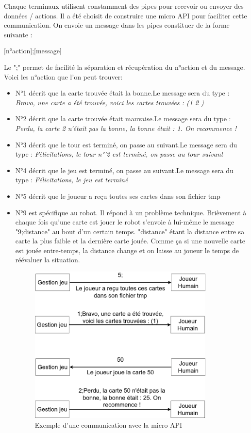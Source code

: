 \documentclass{article}
\begin{document}
Chaque terminaux utilisent constamment des pipes pour recevoir ou envoyer des données / actions. Il a été choisit de construire une micro API pour faciliter cette communication. On envoie un message dans les pipes constituer de la forme suivante :
\begin{center}
[n°action];[message]
\end{center}
Le ";" permet de facilité la séparation et récupération du n°action et du message. Voici les n°action que l'on peut trouver:
\begin{itemize}
	\item N°1 décrit que la carte trouvée était la bonne.\newline Le message sera du type : \textit{Bravo, une carte a été trouvée, voici les cartes trouvées : (1 2 )}
	\item N°2 décrit que la carte trouvée était mauvaise.\newline Le message sera du type : \textit{Perdu, la carte 2 n'était pas la bonne, la bonne était : 1. On recommence !}  
	\item N°3 décrit que le tour est terminé, on passe au suivant.\newline Le message sera du type : \textit{Félicitations, le tour n°'2 est terminé, on passe au tour suivant} 
	\item N°4 décrit que le jeu est terminé, on passe au suivant.\newline Le message sera du type : \textit{Félicitations, le jeu est terminé}
	\item N°5 décrit que le joueur a reçu toutes ses cartes dans son fichier tmp     
	\item N°9 est spécifique au robot. Il répond à un problème technique. Brièvement à chaque fois qu'une carte est jouer le robot s'envoie à lui-même le message "9;distance" au bout d'un certain temps. "distance" étant la distance entre sa carte la plus faible et la dernière carte jouée. Comme ça si une nouvelle carte est jouée entre-temps, la distance change et on laisse au joueur le temps de réévaluer la situation.
	
\begin{figure}[!htb]
	\centering
    	\includegraphics[height=8cm]{./assets/pipe_com.png}
    	\caption{
	    	Exemple d'une communication avec la micro API
    	}
    	\label{fig:pipe}
\end{figure}


\end{itemize}
\end{document}
